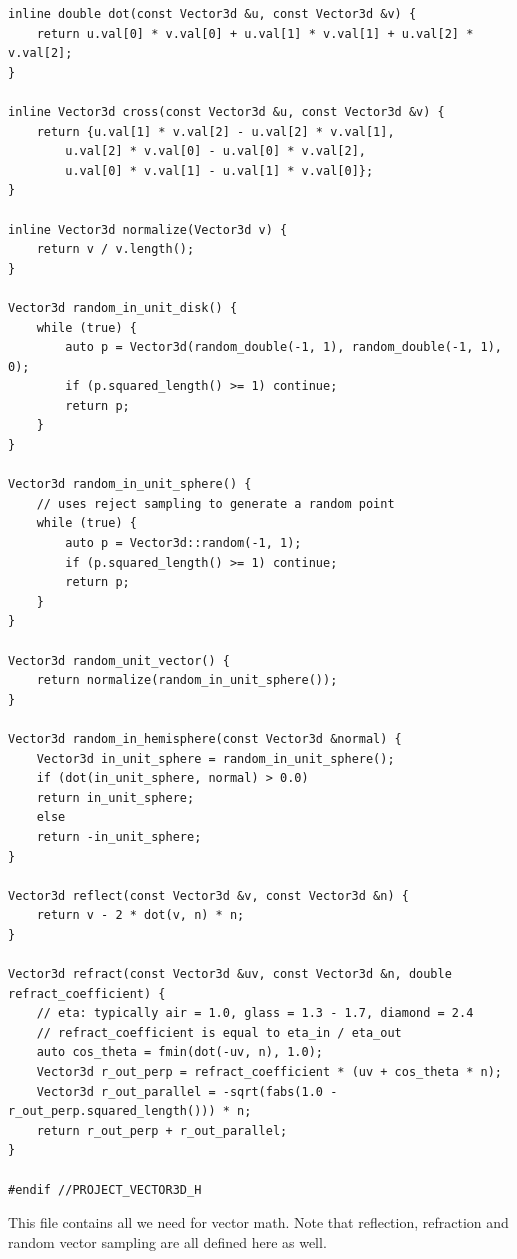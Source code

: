 \documentclass[utf8]{article}
\begin{document}
\begin{lstlisting}[style=CStyle]
inline double dot(const Vector3d &u, const Vector3d &v) {
	return u.val[0] * v.val[0] + u.val[1] * v.val[1] + u.val[2] * v.val[2];
}

inline Vector3d cross(const Vector3d &u, const Vector3d &v) {
	return {u.val[1] * v.val[2] - u.val[2] * v.val[1],
		u.val[2] * v.val[0] - u.val[0] * v.val[2],
		u.val[0] * v.val[1] - u.val[1] * v.val[0]};
}

inline Vector3d normalize(Vector3d v) {
	return v / v.length();
}

Vector3d random_in_unit_disk() {
	while (true) {
		auto p = Vector3d(random_double(-1, 1), random_double(-1, 1), 0);
		if (p.squared_length() >= 1) continue;
		return p;
	}
}

Vector3d random_in_unit_sphere() {
	// uses reject sampling to generate a random point
	while (true) {
		auto p = Vector3d::random(-1, 1);
		if (p.squared_length() >= 1) continue;
		return p;
	}
}

Vector3d random_unit_vector() {
	return normalize(random_in_unit_sphere());
}

Vector3d random_in_hemisphere(const Vector3d &normal) {
	Vector3d in_unit_sphere = random_in_unit_sphere();
	if (dot(in_unit_sphere, normal) > 0.0)
	return in_unit_sphere;
	else
	return -in_unit_sphere;
}

Vector3d reflect(const Vector3d &v, const Vector3d &n) {
	return v - 2 * dot(v, n) * n;
}

Vector3d refract(const Vector3d &uv, const Vector3d &n, double refract_coefficient) {
	// eta: typically air = 1.0, glass = 1.3 - 1.7, diamond = 2.4
	// refract_coefficient is equal to eta_in / eta_out
	auto cos_theta = fmin(dot(-uv, n), 1.0);
	Vector3d r_out_perp = refract_coefficient * (uv + cos_theta * n);
	Vector3d r_out_parallel = -sqrt(fabs(1.0 - r_out_perp.squared_length())) * n;
	return r_out_perp + r_out_parallel;
}

#endif //PROJECT_VECTOR3D_H

\end{lstlisting}
This file contains all we need for vector math. Note that reflection, refraction and random vector sampling are all defined here as well.
\end{document}
